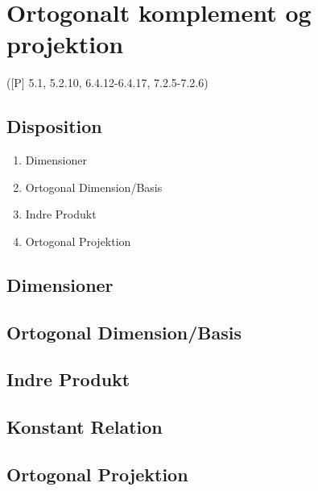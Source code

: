 \newpage
\chapter{Ortogonalt komplement og projektion}
([P] 5.1, 5.2.10, 6.4.12-6.4.17, 7.2.5-7.2.6)

\section*{Disposition}
\begin{enumerate}
	\item Dimensioner
	\item Ortogonal Dimension/Basis
	\item Indre Produkt
	\item Ortogonal Projektion
\end{enumerate}

\section{Dimensioner}


\section{Ortogonal Dimension/Basis}

\section{Indre Produkt}

\section*{Konstant Relation}

\section{Ortogonal Projektion}

